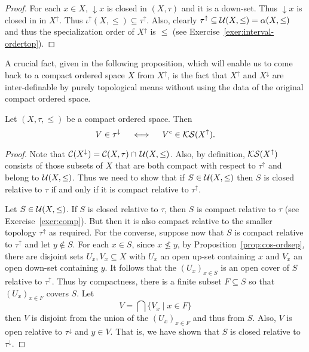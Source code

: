  \begin{proof}
 For each $x\in X$, ${\downarrow}x$ is closed in $(X,\tau)$ and it is a down-set. Thus ${\downarrow}x$ is closed in in $X^{\uparrow}$. Thus $\iota^{\uparrow}(X,\leq)\subseteq \tau^{\uparrow}$. Also, clearly
 $\tau^{\uparrow}\subseteq \mathcal{U}(X,\leq)=\alpha(X,\leq)$ and thus the specialization order of $X^{\uparrow}$ is $\leq$ (see Exercise~\ref{exer:interval-ordertop}).
 \end{proof}

 A crucial fact, given in the following proposition, which will enable us to come back to a compact ordered space $X$ from $X^{\uparrow}$, is the fact that $X^{\uparrow}$ and $X^{\downarrow}$ are inter-definable by purely topological means without using the data of the original compact ordered space.

\begin{proposition}\label{prop:Fdown=Kup}
Let $(X,\tau,\leq)$ be a compact ordered space. Then
\[
V\in\tau^{\downarrow} \quad\iff\quad V^c\in\mathcal{KS}(X^{\uparrow}).
\]
\end{proposition}

 \begin{proof}
Note that $\mathcal{C}(X^{\downarrow})=\mathcal{C}(X,\tau)\cap\,\mathcal{U}(X,\leq)$. Also, by definition, $\mathcal{KS}(X^{\uparrow})$ consists of those subsets of $X$ that are both compact with respect to $\tau^{\uparrow}$ and belong to $\mathcal{U}(X,\leq)$. Thus we need to show that if $S\in\mathcal{U}(X,\leq)$ then $S$ is closed relative to $\tau$ if and only if it is compact relative to $\tau^{\uparrow}$.

Let $S\in\mathcal{U}(X,\leq)$. If $S$ is  closed relative to $\tau$, then $S$ is compact relative to $\tau$ (see Exercise~\ref{exer:comp}). But then it is also compact relative to the smaller topology  $\tau^{\uparrow}$ as required. For the converse, suppose now that $S$ is compact relative to $\tau^{\uparrow}$ and let $y\not\in S$. For each $x\in S$, since $x\nleq y$, by Proposition~\ref{prop:cos-ordsep}, there are disjoint sets $U_x,V_x\subseteq X$ with $U_x$ an open up-set containing $x$ and $V_x$ an open down-set containing $y$. It follows that the $(U_x)_{x\in S}$ is an open cover of $S$ relative to $\tau^{\uparrow}$. Thus by compactness, there is a finite subset $F\subseteq S$ so that $(U_x)_{x\in F}$ covers $S$. Let
\[
V=\bigcap\{V_x\mid x\in F\}
\]
then $V$ is disjoint from the union of the $(U_x)_{x\in F}$ and thus from $S$. Also, $V$ is open relative to $\tau^{\downarrow}$ and $y\in V$. That is, we have shown that $S$ is closed relative to $\tau^{\downarrow}$.
 \end{proof}



